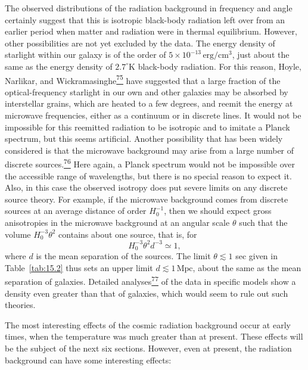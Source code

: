 The observed distributions of the radiation background in frequency and angle
certainly suggest that this is isotropic black-body radiation left over from an
earlier period when matter and radiation were in thermal equilibrium. However,
other possibilities are not yet excluded by the data. The energy density of
starlight within our galaxy is of the order of
\(5\times10^{-13}\,\mathrm{erg/cm^3}\), just about the same as the energy
density of \(2.7^\circ\mathrm{K}\) black-body radiation. For this reason,
Hoyle, Narlikar, and
Wickramasinghe\hyperref[ch15-ref-75]{\textsuperscript{75}} have suggested
that a large fraction of the optical-frequency starlight in our own and other
galaxies may be absorbed by interstellar grains, which are heated to a few
degrees, and reemit the energy at microwave frequencies, either as a continuum
or in discrete lines. It would not be impossible for this reemitted radiation
to be isotropic and to imitate a Planck spectrum, but this seems artificial.
Another possibility that has been widely considered is that the microwave
background may arise from a large number of discrete
sources.\hyperref[ch15-ref-76]{\textsuperscript{76}} Here again, a Planck
spectrum would not be impossible over the accessible range of wavelengths, but
there is no special reason to expect it. Also, in this case the observed
isotropy does put severe limits on any discrete source theory. For example, if
the microwave background comes from discrete sources at an average distance of
order \(H_0^{-1}\), then we should expect gross anisotropies in the microwave
background at an angular scale \(\theta\) such that the volume
\(H_0^{-3}\theta^2\) contains about one source, that is, for
\begin{equation}
  H_0^{-3}\theta^2d^{-3}\simeq1,
  \tag{15.5.40}\label{eq:15.5.40}
\end{equation}
where \(d\) is the mean separation of the sources. The limit
\(\theta\lesssim1\) sec given in Table~\ref{tab:15.2} thus sets an upper
limit \(d\lesssim1\,\mathrm{Mpc}\), about the same as the mean separation of
galaxies. Detailed analyses\hyperref[ch15-ref-77]{\textsuperscript{77}} of the
data in specific models show a density even greater than that of galaxies,
which would seem to rule out such theories.

The most interesting effects of the cosmic radiation background occur at early
times, when the temperature was much greater than at present. These effects
will be the subject of the next six sections. However, even at present, the
radiation background can have some interesting effects:

